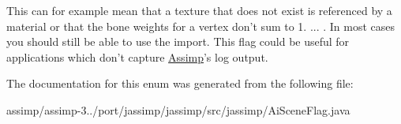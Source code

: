 This can for example mean that a texture that does not exist is referenced by a material or that the bone weights for a vertex don't sum to 1. ... . In most cases you should still be able to use the import. This flag could be useful for applications which don't capture \hyperlink{class_assimp}{Assimp}'s log output. 

The documentation for this enum was generated from the following file\+:\begin{DoxyCompactItemize}
\item 
assimp/assimp-\/3../port/jassimp/jassimp/src/jassimp/Ai\+Scene\+Flag.\+java\end{DoxyCompactItemize}
